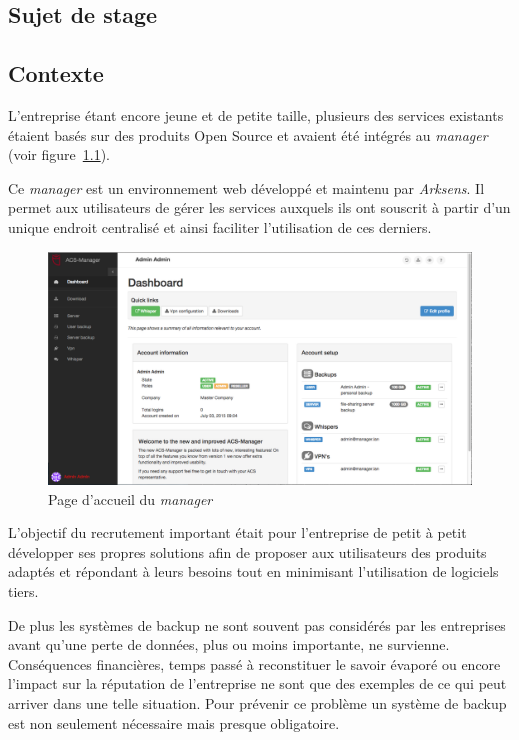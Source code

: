 \documentclass[a4paper,10pt, twoside]{report}
\begin{document}
\begin{spacing}{1.2}
\chapter{Sujet de stage}
\thispagestyle{fancy}
\section{Contexte}

L'entreprise étant encore jeune et de petite taille, plusieurs des services
existants étaient basés sur des produits Open Source et avaient été
intégrés au \textit{manager} (voir figure~\ref{managerFront}).

Ce \textit{manager} est un environnement web développé et maintenu par
\textit{Arksens}. Il permet aux utilisateurs de gérer les services auxquels
ils ont souscrit à partir d'un unique endroit centralisé et ainsi
faciliter l'utilisation de ces derniers.

\begin{figure}[h!]
  \centering
  \includegraphics[width=15cm]{produits/manager.png}
  \caption{\label{managerFront} Page d'accueil du \textit{manager}}
\end{figure}

L'objectif du recrutement important était pour l'entreprise de petit à
petit développer ses propres solutions afin de proposer aux utilisateurs des
produits adaptés et répondant à leurs besoins tout en minimisant
l'utilisation de logiciels tiers.

De plus les systèmes de backup ne sont souvent pas considérés par les
entreprises avant qu'une perte de données, plus ou moins importante,
ne survienne. Conséquences financières, temps passé à reconstituer le
savoir évaporé ou encore l'impact sur la réputation de l'entreprise ne sont
que des exemples de ce qui peut arriver dans une telle situation. Pour
prévenir ce problème un système de backup est non seulement nécessaire
mais presque obligatoire.


\end{spacing}
\end{document}
